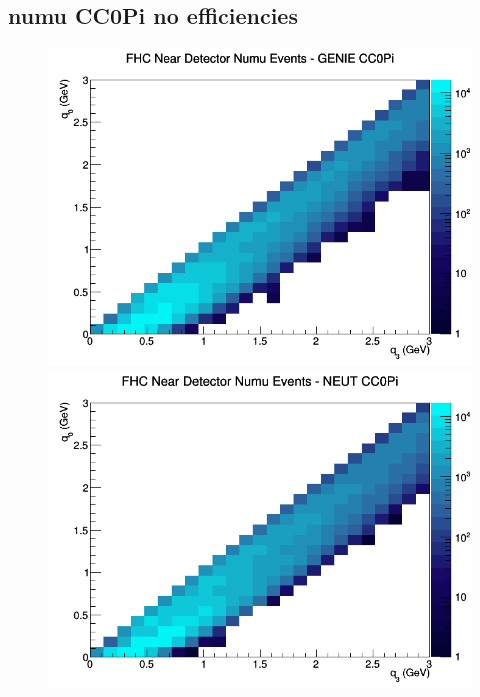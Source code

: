 \subsection{numu CC0Pi no efficiencies}
\begin{figure}[h]
\includegraphics[width=\linewidth]{q0_q3/nominal/CC0Pi_FHC_ND_numu_q3_q0_GENIE.png}
\endminipage
{}
\includegraphics[width=\linewidth]{q0_q3/nominal/CC0Pi_FHC_ND_numu_q3_q0_NEUT.png}
\endminipage
{}

\end{figure}
